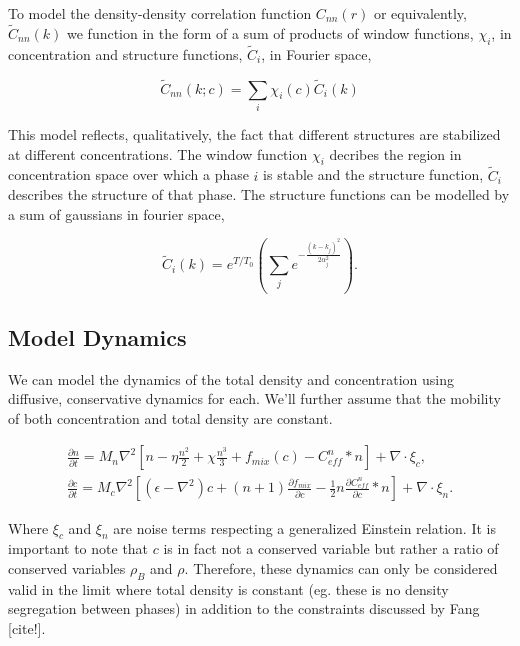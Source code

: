 \documentclass[showkeys, prb, reprint]{revtex4-1}
\newcommand{\B}{\rho_B}
\renewcommand{\l}{\left}
\renewcommand{\r}{\right}
\newcommand{\f}{\frac}
\begin{document}
To model the density-density correlation function $C_{nn}(r)$ or equivalently, $\tilde{C}_{nn}(k)$ we function in the form of a sum of products of window functions, $\chi_i$, in concentration and structure functions, $\tilde{C}_i$, in Fourier space, 

\begin{equation}
  \tilde{C}_{nn}(k; c) = \sum_i \chi_i (c) \tilde{C}_i (k)
\end{equation}

This model reflects, qualitatively, the fact that different structures are stabilized at different concentrations. The window function $\chi_i$ decribes the region in concentration space over which a phase $i$ is stable and the structure function, $\tilde{C}_i$ describes the structure of that phase. The structure functions can be modelled by a sum of gaussians in fourier space, 

\begin{equation}
  \tilde{C}_i(k) = e^{T/T_0}\l(\sum_j e^{-\f{(k - k_j)^2}{2 \alpha_j^2}}\r).
\end{equation}

\subsection{Model Dynamics}

We can model the dynamics of the total density and concentration using diffusive, conservative dynamics for each. We'll further assume that the mobility of both concentration and total density are constant. 

\begin{gather}
	\f{\partial n}{\partial t} = M_{n} \nabla^2 \l[n - \eta \f{n^2}{2} + \chi \f{n^3}{3} + f_{mix}(c) - C^n_{eff} \ast n \r] + \nabla \cdot\xi_c, \\
	\f{\partial c}{\partial t} = M_{c} \nabla^2 \l[\l(\epsilon - \nabla^2\r)c + \l(n + 1\r)\f{\partial f_{mix}}{\partial c} - \f{1}{2} n \f{\partial C^n_{eff}}{\partial c} \ast n\r] + \nabla \cdot \xi_n.
\end{gather}

Where $\xi_c$ and $\xi_n$ are noise terms respecting a generalized Einstein relation. It is important to note that $c$ is in fact not a conserved variable but rather a ratio of conserved variables $\B$ and $\rho$. Therefore, these dynamics can only be considered valid in the limit where total density is constant (eg. these is no density segregation between phases) in addition to the constraints discussed by Fang [cite!]. 
\end{document}
